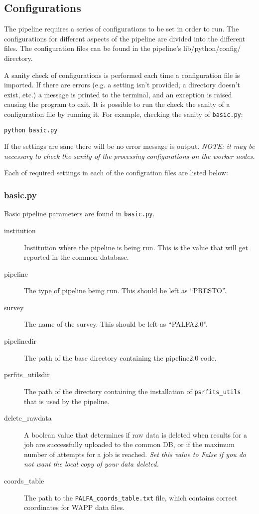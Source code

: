 \subsection{Configurations}
\label{sec:configs}

The pipeline requires a series of configurations to be set in order to run. The configurations for different aspects of the pipeline are divided into the different files. The configuration files can be found in the pipeline's lib/python/config/ directory.

A sanity check of configurations is performed each time a configuration file is imported. If there are errors (e.g. a setting isn't provided, a directory doesn't exist, etc.) a message is printed to the terminal, and an exception is raised causing the program to exit. It is possible to run the check the sanity of a configuration file by running it. For example, checking the sanity of \texttt{basic.py}:

\texttt{python basic.py}

If the settings are sane there will be no error message is output. \textit{NOTE: it may be necessary to check the sanity of the processing configurations on the worker nodes.}

Each of required settings in each of the configration files are listed below:

\subsubsection{basic.py}
Basic pipeline parameters are found in \texttt{basic.py}.

\begin{description}
    \item[institution] Institution where the pipeline is being run. This is the value that will get reported in the common database.
    \item[pipeline] The type of pipeline being run. This should be left as ``PRESTO''.
    \item[survey] The name of the survey. This should be left as ``PALFA2.0''.
    \item[pipelinedir] The path of the base directory containing the pipeline2.0 code.
    \item[psrfits\_utilsdir] The path of the directory containing the installation of \texttt{psrfits\_utils} that is used by the pipeline.
    \item[delete\_rawdata] A boolean value that determines if raw data is deleted when results for a job are successfully uploaded to the common DB, or if the maximum number of attempts for a job is reached. \textit{Set this value to False if you do not want the local copy of your data deleted.}
    \item[coords\_table] The path to the \texttt{PALFA\_coords\_table.txt} file, which contains correct coordinates for WAPP data files.
\end{description}

